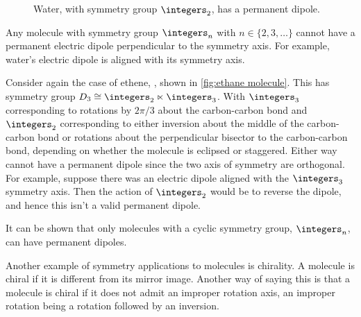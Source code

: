 \begin{figure}
    \caption{Water, with symmetry group \(\integers_2\), has a permanent dipole.}
    \label{fig:water}
\end{figure}

Any molecule with symmetry group \(\integers_n\) with \(n \in \{2, 3, \dotsc\}\) cannot have a permanent electric dipole perpendicular to the symmetry axis.
For example, water's electric dipole is aligned with its symmetry axis.

Consider again the case of ethene, , shown in \cref{fig:ethane molecule}.
This has symmetry group \(D_3 \isomorphic \integers_2 \ltimes \integers_3\).
With \(\integers_3\) corresponding to rotations by \(2\pi/3\) about the carbon-carbon bond and \(\integers_2\) corresponding to either inversion about the middle of the carbon-carbon bond or rotations about the perpendicular bisector to the carbon-carbon bond, depending on whether the molecule is eclipsed or staggered.
Either way  cannot have a permanent dipole since the two axis of symmetry are orthogonal.
For example, suppose there was an electric dipole aligned with the \(\integers_3\) symmetry axis.
Then the action of \(\integers_2\) would be to reverse the dipole, and hence this isn't a valid permanent dipole.

It can be shown that only molecules with a cyclic symmetry group, \(\integers_n\), can have permanent dipoles.

Another example of symmetry applications to molecules is chirality.
A molecule is chiral if it is different from its mirror image.
Another way of saying this is that a molecule is chiral if it does not admit an improper rotation axis, an improper rotation being a rotation followed by an inversion.

